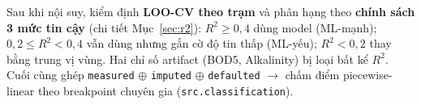Sau khi nội suy, kiểm định \textbf{LOO-CV theo trạm} và phân hạng theo \textbf{chính sách 3 mức tin cậy} (chi tiết Mục~\ref{sec:r2}): $R^2\ge0{,}4$ dùng model (ML-mạnh); $0{,}2\le R^2<0{,}4$ vẫn dùng nhưng gắn cờ độ tin thấp (ML-yếu); $R^2<0{,}2$ thay bằng trung vị vùng. Hai chỉ số artifact (BOD5, Alkalinity) bị loại bất kể $R^2$. Cuối cùng ghép \texttt{measured} $\oplus$ \texttt{imputed} $\oplus$ \texttt{defaulted} $\to$ chấm điểm piecewise-linear theo breakpoint chuyên gia (\texttt{src.classification}).
